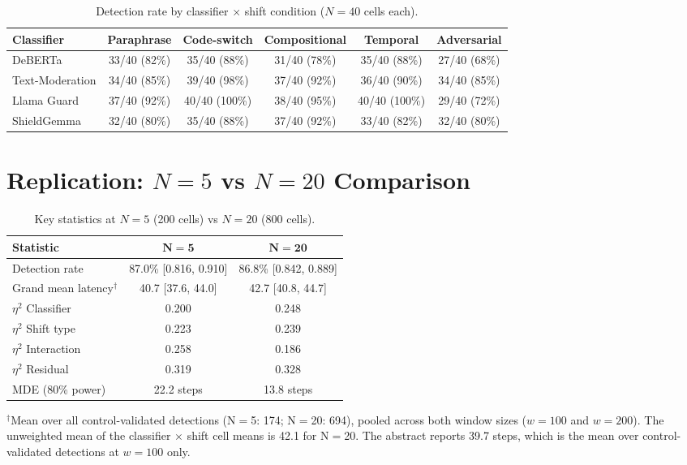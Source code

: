 \documentclass{article}
\begin{document}
\begin{table}[h]
\caption{Detection rate by classifier $\times$ shift condition ($N{=}40$ cells each).}
\centering
\small
\begin{tabular}{lccccc}
\toprule
\textbf{Classifier} & \textbf{Paraphrase} & \textbf{Code-switch} & \textbf{Compositional} & \textbf{Temporal} & \textbf{Adversarial} \\
\midrule
DeBERTa & 33/40 (82\%) & 35/40 (88\%) & 31/40 (78\%) & 35/40 (88\%) & 27/40 (68\%) \\
Text-Moderation & 34/40 (85\%) & 39/40 (98\%) & 37/40 (92\%) & 36/40 (90\%) & 34/40 (85\%) \\
Llama Guard & 37/40 (92\%) & 40/40 (100\%) & 38/40 (95\%) & 40/40 (100\%) & 29/40 (72\%) \\
ShieldGemma & 32/40 (80\%) & 35/40 (88\%) & 37/40 (92\%) & 33/40 (82\%) & 32/40 (80\%) \\
\bottomrule
\end{tabular}
\end{table}

\section{Replication: $N{=}5$ vs $N{=}20$ Comparison}
\label{app:replication}

\begin{table}[h]
\caption{Key statistics at $N{=}5$ (200 cells) vs $N{=}20$ (800 cells).}
\centering
\small
\begin{tabular}{lcc}
\toprule
\textbf{Statistic} & $\boldsymbol{N{=}5}$ & $\boldsymbol{N{=}20}$ \\
\midrule
Detection rate & 87.0\% [0.816, 0.910] & 86.8\% [0.842, 0.889] \\
Grand mean latency$^\dagger$ & 40.7 [37.6, 44.0] & 42.7 [40.8, 44.7] \\
$\eta^2$ Classifier & 0.200 & 0.248 \\
$\eta^2$ Shift type & 0.223 & 0.239 \\
$\eta^2$ Interaction & 0.258 & 0.186 \\
$\eta^2$ Residual & 0.319 & 0.328 \\
MDE (80\% power) & 22.2 steps & 13.8 steps \\
\bottomrule
\end{tabular}
\end{table}

{\footnotesize $^\dagger$Mean over all control-validated detections (N${=}$5: 174; N${=}$20: 694), pooled across both window sizes ($w{=}100$ and $w{=}200$). The unweighted mean of the classifier $\times$ shift cell means is 42.1 for N${=}$20. The abstract reports 39.7 steps, which is the mean over control-validated detections at $w{=}100$ only.}
\end{document}
